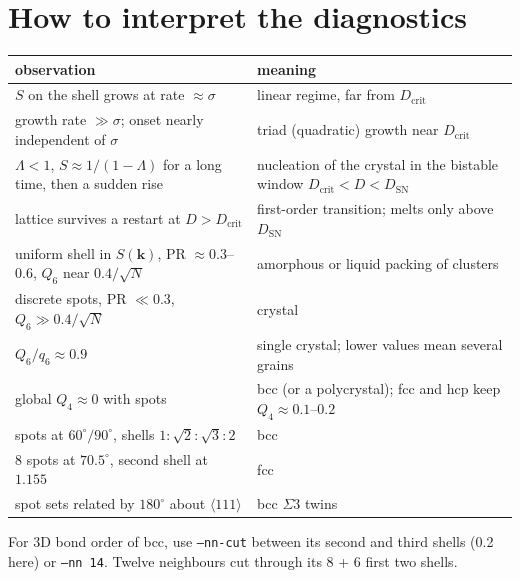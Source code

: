 \documentclass[11pt]{article}
\newcommand{\code}[1]{\texttt{#1}}
\newcommand{\Dc}{D_{\mathrm{crit}}}
\newcommand{\Dsn}{D_{\mathrm{SN}}}
\begin{document}
\section{How to interpret the diagnostics}
\begin{center}
\begin{tabularx}{\textwidth}{@{}lL@{}}
\toprule
observation & meaning \\
\midrule
$S$ on the shell grows at rate $\approx\sigma$ & linear regime, far from $\Dc$ \\
growth rate $\gg\sigma$; onset nearly independent of $\sigma$ & triad (quadratic) growth near $\Dc$ \\
$\Lambda<1$, $S\approx1/(1-\Lambda)$ for a long time, then a sudden rise & nucleation of the crystal in the bistable window $\Dc<D<\Dsn$ \\
lattice survives a restart at $D>\Dc$ & first-order transition; melts only above $\Dsn$ \\
uniform shell in $S(\mathbf k)$, PR $\approx0.3$--$0.6$, $Q_6$ near $0.4/\sqrt N$ & amorphous or liquid packing of clusters \\
discrete spots, PR $\ll0.3$, $Q_6\gg0.4/\sqrt N$ & crystal \\
$Q_6/q_6\approx0.9$ & single crystal; lower values mean several grains \\
global $Q_4\approx0$ with spots & bcc (or a polycrystal); fcc and hcp keep $Q_4\approx0.1$--$0.2$ \\
spots at $60^\circ/90^\circ$, shells $1:\sqrt2:\sqrt3:2$ & bcc \\
8 spots at $70.5^\circ$, second shell at $1.155$ & fcc \\
spot sets related by $180^\circ$ about $\langle111\rangle$ & bcc $\Sigma3$ twins \\
\bottomrule
\end{tabularx}
\end{center}
For 3D bond order of bcc, use \code{--nn-cut} between its second and third
shells (0.2 here) or \code{--nn 14}. Twelve neighbours cut through its 8 + 6
first two shells.
\end{document}
